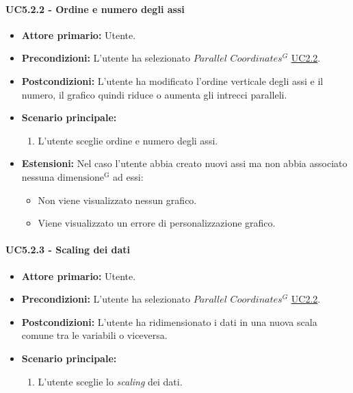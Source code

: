 \paragraph{UC5.2.2 - Ordine e numero degli assi}
\label{sec:UC5.2.2}
    \begin{itemize}
        \item \textbf{Attore primario:} Utente.
        \item \textbf{Precondizioni:} L'utente ha selezionato $Parallel$ $Coordinates^{G}$ \hyperref[sec:UC2.2]{UC2.2}.
	    \item \textbf{Postcondizioni:} L'utente ha modificato l'ordine verticale degli assi e il numero, il grafico quindi riduce o aumenta gli intrecci paralleli.
	    \item \textbf{Scenario principale:} 
	    \begin{enumerate}
	    		\item L'utente sceglie ordine e numero degli assi.
		\end{enumerate}
	    \item \textbf{Estensioni:} Nel caso l'utente abbia creato nuovi assi ma non abbia associato nessuna ${\mathrm{dimensione^{G}}}$ ad essi:
              \begin{itemize}
                  \item Non viene visualizzato nessun grafico.
                  \item Viene visualizzato un errore di personalizzazione grafico.
              \end{itemize}
    \end{itemize}
    
\paragraph{UC5.2.3 - Scaling dei dati}
\label{sec:UC5.2.3}
    \begin{itemize}
        \item \textbf{Attore primario:} Utente.
        \item \textbf{Precondizioni:} L'utente ha selezionato $Parallel$ $Coordinates^{G}$ \hyperref[sec:UC2.2]{UC2.2}.
	    \item \textbf{Postcondizioni:} L'utente ha ridimensionato i dati in una nuova scala comune tra le variabili o viceversa.
	    \item \textbf{Scenario principale:} 
	    \begin{enumerate}
	    		\item L'utente sceglie lo \textit{scaling} dei dati.
		\end{enumerate}
    \end{itemize}

